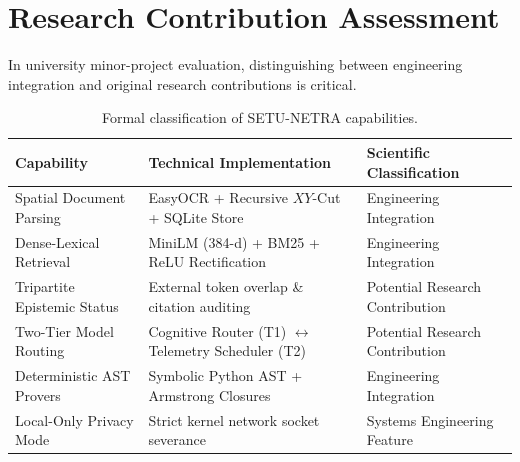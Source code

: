 \documentclass[11pt,a4paper]{article}
\begin{document}
\section{Research Contribution Assessment}
\label{sec:contributions}

In university minor-project evaluation, distinguishing between engineering integration and original research contributions is critical.

\begin{table}[htbp]
\centering
\caption{Formal classification of SETU-NETRA capabilities.}
\label{tab:contribution_classification}
\small
\begin{tabularx}{\textwidth}{@{}lXl@{}}
\toprule
\textbf{Capability} & \textbf{Technical Implementation} & \textbf{Scientific Classification} \\ \midrule
Spatial Document Parsing & EasyOCR + Recursive $XY$-Cut + SQLite Store & Engineering Integration \\
Dense-Lexical Retrieval & MiniLM (384-d) + BM25 + ReLU Rectification & Engineering Integration \\
Tripartite Epistemic Status & External token overlap \& citation auditing & Potential Research Contribution \\
Two-Tier Model Routing & Cognitive Router (T1) $\leftrightarrow$ Telemetry Scheduler (T2) & Potential Research Contribution \\
Deterministic AST Provers & Symbolic Python AST + Armstrong Closures & Engineering Integration \\
Local-Only Privacy Mode & Strict kernel network socket severance & Systems Engineering Feature \\ \bottomrule
\end{tabularx}
\end{table}
\end{document}
